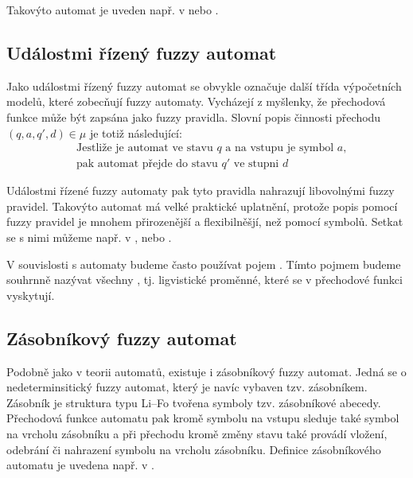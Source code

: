\documentclass[a4paper,10pt]{article}
\begin{document}
Takovýto automat je uveden např. v \cite{Qiu-ChaFuzFinAut} nebo \cite{AlvJoaCru-FuStMaAppEmoModEleGamCha}.

\subsection{Událostmi řízený fuzzy automat} \label{subsec:FuzzEvMach}
Jako událostmi řízený fuzzy automat se obvykle označuje další třída výpočetních modelů, které zobecňují fuzzy automaty. Vycházejí z myšlenky, že přechodová funkce může být zapsána jako fuzzy \ifthen pravidla. Slovní popis činnosti přechodu $(q, a, q', d) \in \mu$ je totiž následující:
\begin{align*}
 &\text{Jestliže je automat ve stavu $q$ a na vstupu je symbol $a$,} \\
 &\text{pak automat přejde do stavu $q'$ ve stupni $d$ }
\end{align*}

Událostmi řízené fuzzy automaty pak tyto pravidla nahrazují libovolnými fuzzy \ifthen pravidel. Takovýto automat má velké praktické uplatnění, protože popis pomocí fuzzy \ifthen pravidel je mnohem přirozenější a flexibilněšjí, než pomocí symbolů. Setkat se s nimi můžeme např. v \cite{TriHei-ExpDesSeqFuzPer}, \cite{AlvJoaCru-FuStMaAppEmoModEleGamCha} nebo \cite{TzaRig-StaAnaAdaFuzzConSysUsiPetrNetLeaAut}.

\begin{note}
 V souvislosti s automaty budeme často používat pojem . Tímto pojmem budeme souhrnně nazývat všechny , tj. ligvistické proměnné, které se v přechodové funkci vyskytují.
\end{note}

\subsection{Zásobníkový fuzzy automat}
Podobně jako v  teorii automatů, existuje i zásobníkový fuzzy automat. Jedná se o nedeterminsitický fuzzy automat, který je navíc vybaven tzv. zásobníkem. Zásobník je struktura typu Li--Fo tvořena symboly tzv. zásobníkové abecedy. Přechodová funkce automatu pak kromě symbolu na vstupu sleduje také symbol na vrcholu zásobníku a při přechodu kromě změny stavu také provádí vložení, odebrání či nahrazení symbolu na vrcholu zásobníku. Definice zásobníkového automatu je uvedena např. v \cite{BucPas-FuzPusAut}.
\end{document}
